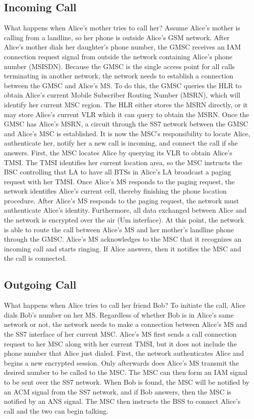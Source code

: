 \documentclass[11pt]{article}
\begin{document}
\subsection{Incoming Call}
What happens when Alice's mother tries to call her? Assume Alice's mother is calling from a landline, so her phone is outside Alice's GSM network. After Alice's mother dials her daughter's phone number, the GMSC receives an IAM connection request signal from outside the network containing Alice's phone number (MSISDN). Because the GMSC is the single access point for all calls terminating in another network, the network needs to establish a connection between the GMSC and Alice's MS. To do this, the GMSC queries the HLR to obtain Alice's current Mobile Subscriber Routing Number (MSRN), which will identify her current MSC region. The HLR either stores the MSRN directly, or it may store Alice's current VLR which it can query to obtain the MSRN. Once the GMSC has Alice's MSRN, a circuit through the SS7 network between the GMSC and Alice's MSC is established. It is now the MSC's responsibility to locate Alice, authenticate her, notify her a new call is incoming, and connect the call if she answers. First, the MSC locates Alice by querying its VLR to obtain Alice's TMSI. The TMSI identifies her current location area, so the MSC instructs the BSC controlling that LA to have all BTSs in Alice's LA broadcast a paging request with her TMSI. Once Alice's MS responds to the paging request, the network identifies Alice's current cell, thereby finishing the phone location procedure. After Alice's MS responds to the paging request, the network must authenticate Alice's identity. Furthermore, all data exchanged between Alice and the network is encrypted over the air (Um interface). At this point, the network is able to route the call between Alice's MS and her mother's landline phone through the GMSC. Alice's MS acknowledges to the MSC that it recognizes an incoming call and starts ringing. If Alice answers, then it notifies the MSC and the call is connected.

\subsection{Outgoing Call}
What happens when Alice tries to call her friend Bob? 
To initiate the call, Alice dials Bob's number on her MS. Regardless of whether Bob is in Alice's same network or not, the network needs to make a connection between Alice's MS and the SS7 interface of her current MSC. Alice's MS first sends a call connection request to her MSC along with her current TMSI, but it does not include the phone number that Alice just dialed. First, the network authenticates Alice and begins a new encrypted session. Only afterwards does Alice's MS transmit the desired number to be called to the MSC. The MSC can then form an IAM signal to be sent over the SS7 network. When Bob is found, the MSC will be notified by an ACM signal from the SS7 network, and if Bob answers, then the MSC is notified by an ANS signal. The MSC then instructs the BSS to connect Alice's call and the two can begin talking.
\end{document}
